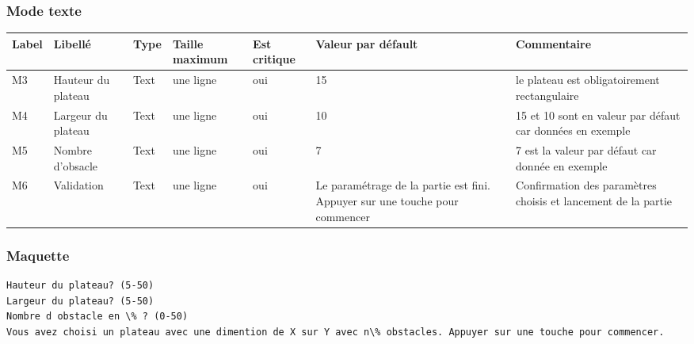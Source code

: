 \documentclass[12pt,a4paper]{article}
\begin{document}
\begin{itemize}
			\subsubsection{Mode texte}
				\hspace{-3cm}
				\begin{tabular}{|p{1cm}|p{2.5cm}|p{1.5cm}|p{3cm}|p{2.5cm}|p{2.5cm}|p{3cm}|} %
				\hline
						Label & Libellé & Type & Taille maximum & Est critique & Valeur par défault & Commentaire \\
					\hline \hline
						M3 & Hauteur du plateau & Text & une ligne & oui & 15 & le plateau est obligatoirement rectangulaire \\
						\hline
						M4 & Largeur du plateau & Text & une ligne & oui & 10 & 15 et 10 sont en valeur par défaut car données en exemple \\
						\hline
						M5 & Nombre d'obsacle & Text & une ligne & oui & 7 & 7 est la valeur par défaut car donnée en exemple \\
						\hline
						M6 & Validation & Text & une ligne & oui & Le paramétrage  de la partie est fini. Appuyer sur une touche pour commencer & Confirmation des paramètres choisis et lancement de la partie\\
					\hline
				\end{tabular}
				\label{Informations présentes sur l'écran de paramétrage texte}
				\subsubsection*{Maquette}
					\begin{lstlisting}
Hauteur du plateau? (5-50)
Largeur du plateau? (5-50)
Nombre d obstacle en \% ? (0-50)
Vous avez choisi un plateau avec une dimention de X sur Y avec n\% obstacles. Appuyer sur une touche pour commencer.
					\end{lstlisting}


\end{itemize}
\end{document}
